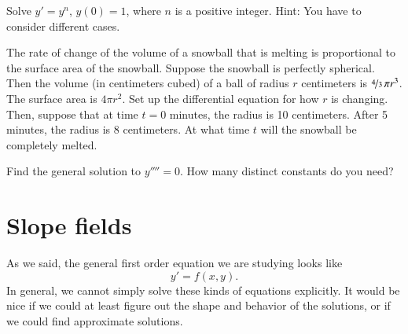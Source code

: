 \documentclass[12pt]{book}
\begin{document}
\begin{exercise}
Solve $y' = y^n$, $y(0) = 1$, where $n$ is a positive integer.
Hint: You have to consider different cases.
\end{exercise}

\begin{exercise}
The rate of change of the volume of a snowball that is melting is 
proportional to the surface area of the snowball.  Suppose the
snowball is perfectly spherical.  Then the volume (in centimeters cubed)
of a ball of radius $r$ centimeters is
$\nicefrac{4}{3}\,\pi r^3$.  The surface area is
$4 \pi r^2$.  Set up the differential equation for how $r$ is changing.
Then, suppose that at time $t=0$ minutes, the radius is 10 centimeters.
After 5 minutes, the radius is 8 centimeters.  At what time $t$ will the 
snowball be completely melted.
\end{exercise}

\begin{exercise}
Find the general solution to $y''''= 0$.  How many distinct constants do you need?
\end{exercise}


\sectionnewpage
\section{Slope fields}


%

As we said, the general first order equation we are studying looks like
\begin{equation*}
y' = f(x,y).
\end{equation*}
In general, we cannot simply solve these kinds of equations explicitly.
It would be nice if we could at least figure out the shape and behavior of
the solutions, or if we could find approximate solutions.
\end{document}
